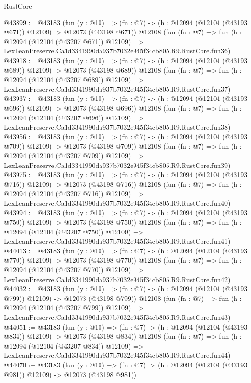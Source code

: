 \begin{lexlean}{RustCore}
\begin{coremodule}
@43899 := @43183
    (fun (y : @10) =>
    (fn : @7) -> (h : @12094 (@12104 (@43193 @671)) @12109) -> @12073 (@43198 @671))
    @12108
    (fun (fn : @7) =>
    fun (h : @12094 (@12104 (@43207 @671)) @12109) =>
    LexLeanPreserve.Ca1d3341990da937b7032e945f34cb805.R9.RustCore.fun36)
@43918 := @43183
    (fun (y : @10) =>
    (fn : @7) -> (h : @12094 (@12104 (@43193 @689)) @12109) -> @12073 (@43198 @689))
    @12108
    (fun (fn : @7) =>
    fun (h : @12094 (@12104 (@43207 @689)) @12109) =>
    LexLeanPreserve.Ca1d3341990da937b7032e945f34cb805.R9.RustCore.fun37)
@43937 := @43183
    (fun (y : @10) =>
    (fn : @7) -> (h : @12094 (@12104 (@43193 @696)) @12109) -> @12073 (@43198 @696))
    @12108
    (fun (fn : @7) =>
    fun (h : @12094 (@12104 (@43207 @696)) @12109) =>
    LexLeanPreserve.Ca1d3341990da937b7032e945f34cb805.R9.RustCore.fun38)
@43956 := @43183
    (fun (y : @10) =>
    (fn : @7) -> (h : @12094 (@12104 (@43193 @709)) @12109) -> @12073 (@43198 @709))
    @12108
    (fun (fn : @7) =>
    fun (h : @12094 (@12104 (@43207 @709)) @12109) =>
    LexLeanPreserve.Ca1d3341990da937b7032e945f34cb805.R9.RustCore.fun39)
@43975 := @43183
    (fun (y : @10) =>
    (fn : @7) -> (h : @12094 (@12104 (@43193 @716)) @12109) -> @12073 (@43198 @716))
    @12108
    (fun (fn : @7) =>
    fun (h : @12094 (@12104 (@43207 @716)) @12109) =>
    LexLeanPreserve.Ca1d3341990da937b7032e945f34cb805.R9.RustCore.fun40)
@43994 := @43183
    (fun (y : @10) =>
    (fn : @7) -> (h : @12094 (@12104 (@43193 @750)) @12109) -> @12073 (@43198 @750))
    @12108
    (fun (fn : @7) =>
    fun (h : @12094 (@12104 (@43207 @750)) @12109) =>
    LexLeanPreserve.Ca1d3341990da937b7032e945f34cb805.R9.RustCore.fun41)
@44013 := @43183
    (fun (y : @10) =>
    (fn : @7) -> (h : @12094 (@12104 (@43193 @770)) @12109) -> @12073 (@43198 @770))
    @12108
    (fun (fn : @7) =>
    fun (h : @12094 (@12104 (@43207 @770)) @12109) =>
    LexLeanPreserve.Ca1d3341990da937b7032e945f34cb805.R9.RustCore.fun42)
@44032 := @43183
    (fun (y : @10) =>
    (fn : @7) -> (h : @12094 (@12104 (@43193 @799)) @12109) -> @12073 (@43198 @799))
    @12108
    (fun (fn : @7) =>
    fun (h : @12094 (@12104 (@43207 @799)) @12109) =>
    LexLeanPreserve.Ca1d3341990da937b7032e945f34cb805.R9.RustCore.fun43)
@44051 := @43183
    (fun (y : @10) =>
    (fn : @7) -> (h : @12094 (@12104 (@43193 @834)) @12109) -> @12073 (@43198 @834))
    @12108
    (fun (fn : @7) =>
    fun (h : @12094 (@12104 (@43207 @834)) @12109) =>
    LexLeanPreserve.Ca1d3341990da937b7032e945f34cb805.R9.RustCore.fun44)
@44070 := @43183
    (fun (y : @10) =>
    (fn : @7) -> (h : @12094 (@12104 (@43193 @981)) @12109) -> @12073 (@43198 @981))

\end{coremodule}
\end{lexlean}
